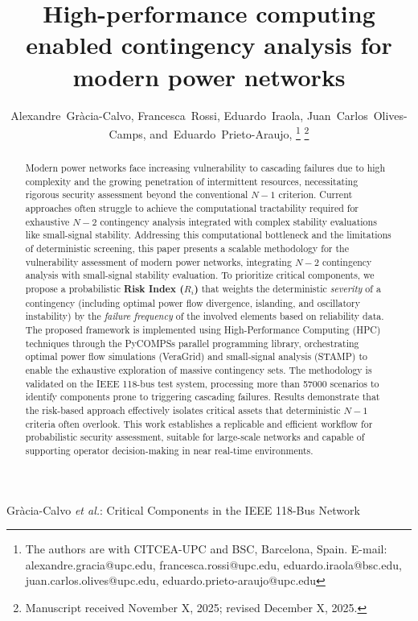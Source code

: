 \documentclass[journal]{IEEEtran}
\begin{document}
\title{High-performance computing enabled contingency analysis for modern power networks}

\author{Alexandre~Gràcia-Calvo,
        Francesca~Rossi,
        Eduardo~Iraola, 
        Juan~Carlos~Olives-Camps, 
        and~Eduardo~Prieto-Araujo, %
\thanks{The authors are with CITCEA-UPC and BSC, Barcelona, Spain. E-mail: alexandre.gracia@upc.edu, francesca.rossi@upc.edu, eduardo.iraola@bsc.edu, juan.carlos.olives@upc.edu, eduardo.prieto-araujo@upc.edu}%
\thanks{Manuscript received November X, 2025; revised December X, 2025.}}

%
{Gr\`acia-Calvo \MakeLowercase{\textit{et al.}}: Critical Components in the IEEE 118-Bus Network}

\maketitle


\begin{abstract}
Modern power networks face increasing vulnerability to cascading failures due to high complexity and the growing penetration of intermittent resources, necessitating rigorous security assessment beyond the conventional $N-1$ criterion. Current approaches often struggle to achieve the computational tractability required for exhaustive $N-2$ contingency analysis integrated with complex stability evaluations like small-signal stability. Addressing this computational bottleneck and the limitations of deterministic screening, this paper presents a scalable methodology for the vulnerability assessment of modern power networks, integrating $N-2$ contingency analysis with small-signal stability evaluation. To prioritize critical components, we propose a probabilistic \textbf{Risk Index ($R_i$)} that weights the deterministic \textit{severity} of a contingency (including optimal power flow divergence, islanding, and oscillatory instability) by the \textit{failure frequency} of the involved elements based on reliability data. The proposed framework is implemented using High-Performance Computing (HPC) techniques through the PyCOMPSs parallel programming library, orchestrating optimal power flow simulations (VeraGrid) and small-signal analysis (STAMP) to enable the exhaustive exploration of massive contingency sets. The methodology is validated on the IEEE 118-bus test system, processing more than \num{57000} scenarios to identify components prone to triggering cascading failures. Results demonstrate that the risk-based approach effectively isolates critical assets that deterministic $N-1$ criteria often overlook. This work establishes a replicable and efficient workflow for probabilistic security assessment, suitable for large-scale networks and capable of supporting operator decision-making in near real-time environments.
\end{abstract}
\end{document}
